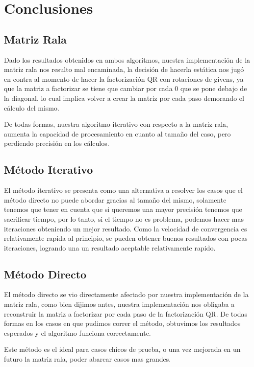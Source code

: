 \section{Conclusiones}

\subsection{Matriz Rala}

Dado los resultados obtenidos en ambos algoritmos, nuestra implementación de la matriz rala nos resulto mal encaminada, la decisión de hacerla estática nos jugó en contra al momento de hacer la factorización QR con rotaciones de givens, ya que la matriz a factorizar se tiene que cambiar por cada 0 que se pone debajo de la diagonal, lo cual implica volver a crear la matriz por cada paso demorando el cálculo del mismo. 

De todas formas, nuestra algoritmo iterativo con respecto a la matriz rala, aumenta la capacidad de procesamiento en cuanto al tamaño del caso, pero perdiendo precisión en los cálculos.

\subsection{Método Iterativo}

El método iterativo se presenta como una alternativa a resolver los casos que el método directo no puede abordar gracias al tamaño del mismo, solamente tenemos que tener en cuenta que si queremos una mayor precisión tenemos que sacrificar tiempo, por lo tanto, si el tiempo no es problema, podemos hacer mas iteraciones obteniendo un mejor resultado. Como la velocidad de convergencia es relativamente rapida al principio, se pueden obtener buenos resultados con pocas iteraciones, logrando una un resultado aceptable relativamente rapido.

\subsection{Método Directo}

El método directo se vio directamente afectado por nuestra implementación de la matriz rala, como bien dijimos antes, nuestra implementación nos obligaba a reconstruir la matriz a factorizar por cada paso de la factorización QR. De todas formas en los casos en que pudimos correr el método, obtuvimos los resultados esperados y el algoritmo funciona correctamente. 

Este método es el ideal para casos chicos de prueba, o una vez mejorada en un futuro la matriz rala, poder abarcar casos mas grandes.